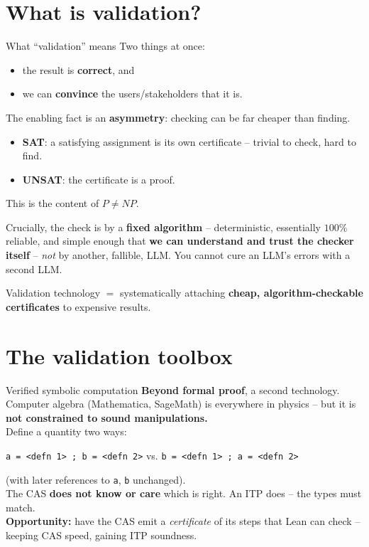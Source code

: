 \documentclass[aspectratio=169,xcolor=dvipsnames]{beamer}
\def\p{\\[0.1in] \pause}
\begin{document}
\section{What is validation?}
\begin{frame}{What ``validation'' means}
Two things at once:
\begin{itemize}
  \item the result is \textbf{correct}, and
  \item we can \textbf{convince} the users/stakeholders that it is.
\end{itemize}\pause\medskip
\pause
The enabling fact is an \textbf{asymmetry}: checking can be far cheaper than finding.
\begin{itemize}
  \item \textbf{SAT}: a satisfying assignment is its own certificate -- trivial to check, hard to find.
  \item \textbf{UNSAT}: the certificate is a proof.
\end{itemize}
This is the content of $P \ne NP$. \pause
\smallskip

Crucially, the check is by a \textbf{fixed algorithm} -- deterministic, essentially $100\%$
reliable, and simple enough that \textbf{we can understand and trust the checker itself} --
\emph{not} by another, fallible, LLM.  You cannot cure an LLM's errors with a second LLM. \pause
\smallskip

Validation technology $=$ systematically attaching \textbf{cheap, algorithm-checkable
certificates} to expensive results.
\end{frame}

\section{The validation toolbox}
\begin{frame}{Verified symbolic computation}
\textbf{Beyond formal proof}, a second technology.  Computer algebra (Mathematica, SageMath)
is everywhere in physics -- but it is \textbf{not constrained to sound manipulations.} \p
\pause
Define a quantity two ways:
\begin{center}
\texttt{a = <defn 1> ; b = <defn 2>} \qquad vs.\qquad
\texttt{b = <defn 1> ; a = <defn 2>}
\end{center}
(with later references to \texttt{a}, \texttt{b} unchanged). \\
The CAS \textbf{does not know or care} which is right.  An ITP does -- the types must match. \p
\pause
\textbf{Opportunity:} have the CAS emit a \emph{certificate} of its steps that Lean can check --
keeping CAS speed, gaining ITP soundness.
\end{frame}
\end{document}
